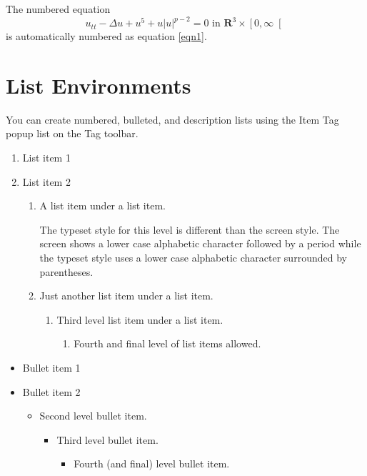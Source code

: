 \documentclass{article}
\begin{document}
The numbered equation 
\begin{equation}
u_{tt}-\Delta u+u^{5}+u\left| u\right| ^{p-2}=0\text{ in }\mathbf{R}%
^{3}\times \left[ 0,\infty \right[  \label{eqn1}
\end{equation}
is automatically numbered as equation \ref{eqn1}.

\section{List Environments}

You can create numbered, bulleted, and description lists using the Item Tag
popup list on the Tag toolbar.

\begin{enumerate}
\item List item 1

\item List item 2

\begin{enumerate}
\item A list item under a list item.

The typeset style for this level is different than the screen style. The
screen shows a lower case alphabetic character followed by a period while
the typeset style uses a lower case alphabetic character surrounded by
parentheses.

\item Just another list item under a list item.

\begin{enumerate}
\item Third level list item under a list item.

\begin{enumerate}
\item Fourth and final level of list items allowed.
\end{enumerate}
\end{enumerate}
\end{enumerate}
\end{enumerate}

\begin{itemize}
\item Bullet item 1

\item Bullet item 2

\begin{itemize}
\item Second level bullet item.

\begin{itemize}
\item Third level bullet item.

\begin{itemize}
\item Fourth (and final) level bullet item.
\end{itemize}
\end{itemize}
\end{itemize}
\end{itemize}
\end{document}
